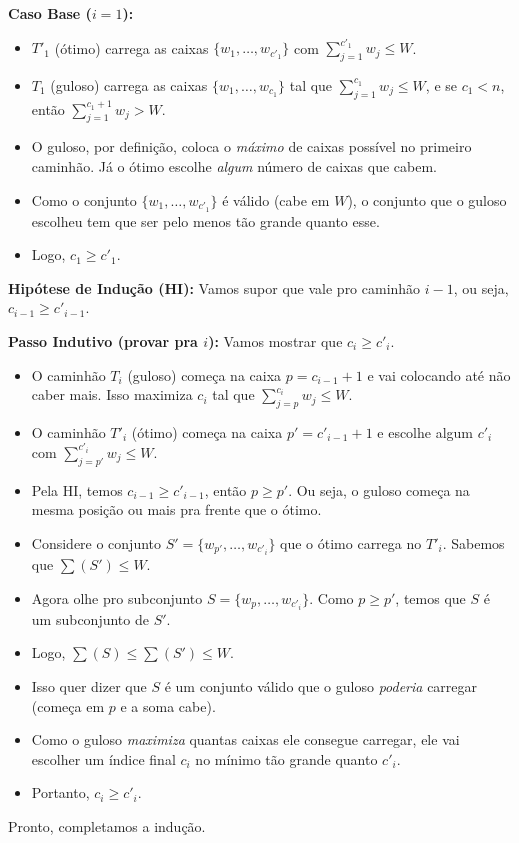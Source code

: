\documentclass[a4paper,12pt]{article}
\begin{document}
\textbf{Caso Base ($i=1$):}
\begin{itemize}
    \item $T'_1$ (ótimo) carrega as caixas $\{w_1, \dots, w_{c'_1}\}$ com $\sum_{j=1}^{c'_1} w_j \le W$.
    \item $T_1$ (guloso) carrega as caixas $\{w_1, \dots, w_{c_1}\}$ tal que $\sum_{j=1}^{c_1} w_j \le W$, e se $c_1 < n$, então $\sum_{j=1}^{c_1+1} w_j > W$.
    \item O guloso, por definição, coloca o \emph{máximo} de caixas possível no primeiro caminhão. Já o ótimo escolhe \emph{algum} número de caixas que cabem.
    \item Como o conjunto $\{w_1, \dots, w_{c'_1}\}$ é válido (cabe em $W$), o conjunto que o guloso escolheu tem que ser pelo menos tão grande quanto esse.
    \item Logo, $c_1 \ge c'_1$.
\end{itemize}

\textbf{Hipótese de Indução (HI):}
Vamos supor que vale pro caminhão $i-1$, ou seja, $c_{i-1} \ge c'_{i-1}$.

\textbf{Passo Indutivo (provar pra $i$):}
Vamos mostrar que $c_i \ge c'_i$.
\begin{itemize}
    \item O caminhão $T_i$ (guloso) começa na caixa $p = c_{i-1} + 1$ e vai colocando até não caber mais. Isso maximiza $c_i$ tal que $\sum_{j=p}^{c_i} w_j \le W$.
    \item O caminhão $T'_i$ (ótimo) começa na caixa $p' = c'_{i-1} + 1$ e escolhe algum $c'_i$ com $\sum_{j=p'}^{c'_i} w_j \le W$.
    \item Pela HI, temos $c_{i-1} \ge c'_{i-1}$, então $p \ge p'$. Ou seja, o guloso começa na mesma posição ou mais pra frente que o ótimo.
    \item Considere o conjunto $S' = \{w_{p'}, \dots, w_{c'_i}\}$ que o ótimo carrega no $T'_i$. Sabemos que $\sum(S') \le W$.
    \item Agora olhe pro subconjunto $S = \{w_p, \dots, w_{c'_i}\}$. Como $p \ge p'$, temos que $S$ é um subconjunto de $S'$.
    \item Logo, $\sum(S) \le \sum(S') \le W$.
    \item Isso quer dizer que $S$ é um conjunto válido que o guloso \emph{poderia} carregar (começa em $p$ e a soma cabe).
    \item Como o guloso \emph{maximiza} quantas caixas ele consegue carregar, ele vai escolher um índice final $c_i$ no mínimo tão grande quanto $c'_i$.
    \item Portanto, $c_i \ge c'_i$.
\end{itemize}
Pronto, completamos a indução.
\end{document}
